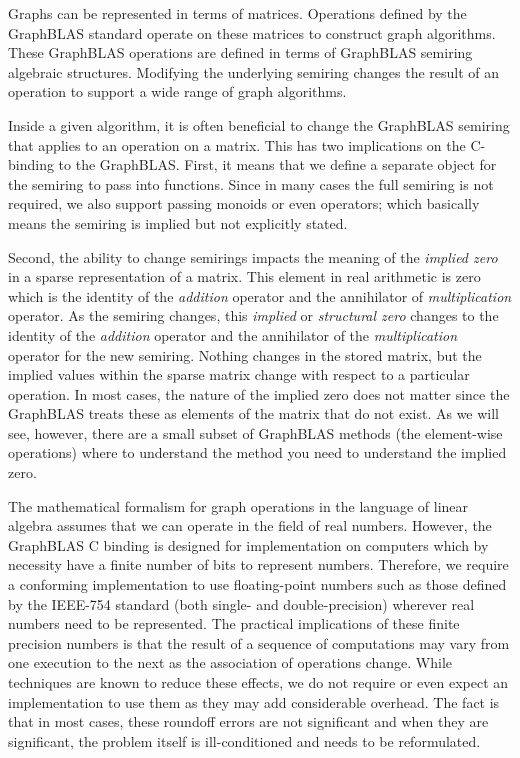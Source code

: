 Graphs can be represented in terms of matrices. Operations defined by the GraphBLAS standard
operate on these matrices to construct graph algorithms.
These GraphBLAS operations are defined in terms of GraphBLAS semiring algebraic 
structures. Modifying the underlying semiring changes the result of 
an operation to support a wide range of graph algorithms.

Inside a given algorithm, it is often beneficial to change the GraphBLAS semiring
that applies to an operation on a matrix.  This has two 
implications on the C-binding to the GraphBLAS.  First,
it means that we define a separate object for the semiring 
to pass into functions.  Since in many cases the full
semiring is not required, we also support passing monoids or
even operators; which basically means the semiring is implied but not 
explicitly stated.

Second, the ability to change semirings impacts the meaning of 
the \emph{implied zero} in a sparse representation of a matrix.
This element in real arithmetic is zero which is the 
identity of the \emph{addition} operator and the annihilator of
\emph{multiplication} operator.   As the semiring changes, this 
\emph{implied} or \emph{structural zero} changes to the identity of 
the \emph{addition} operator and the annihilator of the \emph{multiplication} 
operator for the new semiring.   Nothing changes in the
stored matrix, but the implied values within the sparse matrix change
with respect to a particular operation.  In most cases, the nature
of the implied zero does not matter since the GraphBLAS treats these
as elements of the matrix that do not exist.  As we will see, however,
there are a small subset of GraphBLAS methods 
(the element-wise operations) where to understand 
the method you need to understand the implied zero.

The mathematical formalism for graph operations in the language of 
linear algebra assumes that we can operate in the field of real numbers. 
However, the GraphBLAS C binding is designed for implementation on computers 
which by necessity have a finite number of bits to represent numbers. 
Therefore, we require a conforming implementation to use floating-point 
numbers such as those defined by the IEEE-754 standard (both single- and double-precision) 
wherever real numbers need to be represented. The practical implications of 
these finite precision numbers is that the result of a sequence of 
computations may vary from one execution to the next as the association 
of operations change.  While techniques are known to 
reduce these effects, we do not require or even expect an implementation 
to use them as they may add considerable overhead. The fact is that in most 
cases, these roundoff errors are not significant and when they are significant, 
the problem itself is ill-conditioned and needs to be reformulated.

